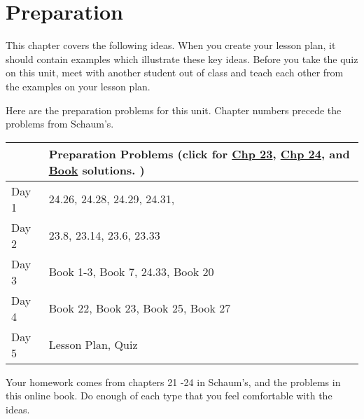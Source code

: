 \section{Preparation}

\noindent  
This chapter covers the following ideas. When you create your lesson plan, it should contain examples which illustrate these key ideas. Before you take the quiz on this unit, meet with another student out of class and teach each other from the examples on your lesson plan. 



Here are the preparation problems for this unit. Chapter numbers precede the problems from Schaum's.
\begin{center}
\begin{tabular}{ll}
&Preparation Problems 
(click for 
\href{https://ilearn.byui.edu/bbcswebdav/institution/Physical\_Sci\_Eng/Mathematics/Personal\%20Folders/WoodruffB/316/07-Laplace-Transforms-23-Solutions.pdf}{Chp 23},
\href{https://ilearn.byui.edu/bbcswebdav/institution/Physical\_Sci\_Eng/Mathematics/Personal\%20Folders/WoodruffB/316/07-Laplace-Transforms-24-Solutions.pdf}{Chp 24}, and 
\href{https://ilearn.byui.edu/bbcswebdav/institution/Physical\_Sci\_Eng/Mathematics/Personal\%20Folders/WoodruffB/316/07-Laplace-Transforms-Book-Solutions.pdf}{Book} solutions.
)
\\
\hline\hline
Day 1&
24.26,
24.28,
24.29,
24.31,
\\\hline
Day 2&
23.8,
23.14, 
23.6,
23.33 
\\\hline
Day 3&
Book 1-3, 
Book 7, 
24.33,
Book 20
\\\hline
Day 4&
Book 22,
Book 23,
Book 25,
Book 27
\\\hline
Day 5& Lesson Plan, Quiz
\\\hline
\end{tabular}
\end{center}

Your homework comes from chapters 21 -24 in Schaum's, and the problems in this online book. Do enough of each type that you feel comfortable with the ideas. 

